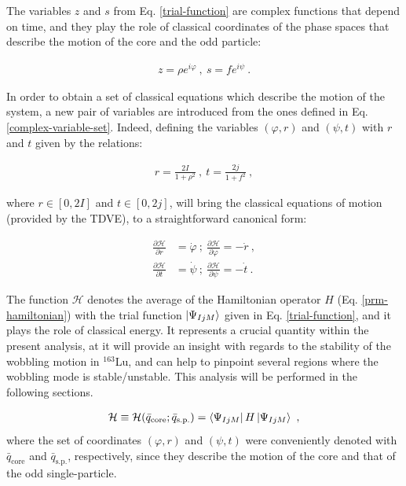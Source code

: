 \documentclass[11pt]{article}
\begin{document}
The variables $z$ and $s$ from Eq. \ref{trial-function} are complex functions that depend on time, and they play the role of classical coordinates of the phase spaces that describe the motion of the core and the odd particle:

\begin{align}
    z=\rho e^{i\varphi}\ ,\ s=fe^{i\psi}\ .
    \label{complex-variable-set}
\end{align}

In order to obtain a set of classical equations which describe the motion of the system, a new pair of variables are introduced from the ones defined in Eq. \ref{complex-variable-set}. Indeed, defining the variables $(\varphi,r)$ and $(\psi,t)$ with $r$ and $t$ given by the relations:

\begin{align}
    r=\frac{2I}{1+\rho^2}\ ,\ t=\frac{2j}{1+f^2}\ ,
\end{align}

where $r\in\left[0,2I\right]$ and $t\in\left[0,2j\right]$, will bring the classical equations of motion (provided by the TDVE), to a straightforward canonical form:

\begin{align}
    \frac{\partial\mathcal{H}}{\partial r}&=\dot{\varphi}\ ;\ \frac{\partial\mathcal{H}}{\partial \varphi}=-\dot{r}\ , \nonumber\\
    \frac{\partial\mathcal{H}}{\partial t}&=\dot{\psi}\ ;\ \frac{\partial\mathcal{H}}{\partial \psi}=-\dot{t}\ .
    \label{eq-motion}
\end{align}

The function $\mathcal{H}$ denotes the average of the Hamiltonian operator $H$ (Eq. \ref{prm-hamiltonian}) with the trial function $\ket{\Psi_{IjM}}$ given in Eq. \ref{trial-function}, and it plays the role of classical energy. It represents a crucial quantity within the present analysis, at it will provide an insight with regards to the stability of the wobbling motion in $^{163}$Lu, and can help to pinpoint several regions where the wobbling mode is stable/unstable. This analysis will be performed in the following sections.

\begin{align}
    \mathcal{H}\equiv\mathcal{H}(\bar{q}_\text{core};\bar{q}_\text{s.p.})=\bra{\Psi_{IjM}}H\ket{\Psi_{IjM}}\ ,
\end{align}
where the set of coordinates $(\varphi,r)$ and $(\psi,t)$ were conveniently denoted with $\bar{q}_\text{core}$ and $\bar{q}_\text{s.p.}$, respectively, since they describe the motion of the core and that of the odd single-particle.
\end{document}
